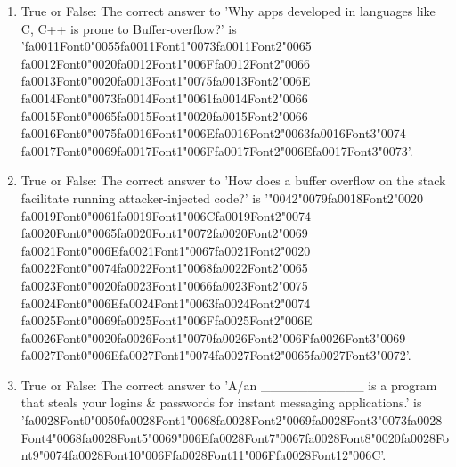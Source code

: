 \documentclass[12pt]{article}
\begin{document}
\begin{enumerate}[label=\arabic*.]
\item True or False: The correct answer to 'Why apps developed in languages like C, C++ is prone to Buffer-overflow?' is '{\csname fa0011Font0\endcsname\char"0055}{\csname fa0011Font1\endcsname\char"0073}{\csname fa0011Font2\endcsname\char"0065} {\csname fa0012Font0\endcsname\char"0020}{\csname fa0012Font1\endcsname\char"006F}{\csname fa0012Font2\endcsname\char"0066} {\csname fa0013Font0\endcsname\char"0020}{\csname fa0013Font1\endcsname\char"0075}{\csname fa0013Font2\endcsname\char"006E} {\csname fa0014Font0\endcsname\char"0073}{\csname fa0014Font1\endcsname\char"0061}{\csname fa0014Font2\endcsname\char"0066} {\csname fa0015Font0\endcsname\char"0065}{\csname fa0015Font1\endcsname\char"0020}{\csname fa0015Font2\endcsname\char"0066} {\csname fa0016Font0\endcsname\char"0075}{\csname fa0016Font1\endcsname\char"006E}{\csname fa0016Font2\endcsname\char"0063}{\csname fa0016Font3\endcsname\char"0074} {\csname fa0017Font0\endcsname\char"0069}{\csname fa0017Font1\endcsname\char"006F}{\csname fa0017Font2\endcsname\char"006E}{\csname fa0017Font3\endcsname\char"0073}'.
\item True or False: The correct answer to 'How does a buffer overflow on the stack facilitate running attacker-injected code?' is '{\char"0042}{\char"0079}{\csname fa0018Font2\endcsname\char"0020} {\csname fa0019Font0\endcsname\char"0061}{\csname fa0019Font1\endcsname\char"006C}{\csname fa0019Font2\endcsname\char"0074} {\csname fa0020Font0\endcsname\char"0065}{\csname fa0020Font1\endcsname\char"0072}{\csname fa0020Font2\endcsname\char"0069} {\csname fa0021Font0\endcsname\char"006E}{\csname fa0021Font1\endcsname\char"0067}{\csname fa0021Font2\endcsname\char"0020} {\csname fa0022Font0\endcsname\char"0074}{\csname fa0022Font1\endcsname\char"0068}{\csname fa0022Font2\endcsname\char"0065} {\csname fa0023Font0\endcsname\char"0020}{\csname fa0023Font1\endcsname\char"0066}{\csname fa0023Font2\endcsname\char"0075} {\csname fa0024Font0\endcsname\char"006E}{\csname fa0024Font1\endcsname\char"0063}{\csname fa0024Font2\endcsname\char"0074} {\csname fa0025Font0\endcsname\char"0069}{\csname fa0025Font1\endcsname\char"006F}{\csname fa0025Font2\endcsname\char"006E} {\csname fa0026Font0\endcsname\char"0020}{\csname fa0026Font1\endcsname\char"0070}{\csname fa0026Font2\endcsname\char"006F}{\csname fa0026Font3\endcsname\char"0069} {\csname fa0027Font0\endcsname\char"006E}{\csname fa0027Font1\endcsname\char"0074}{\csname fa0027Font2\endcsname\char"0065}{\csname fa0027Font3\endcsname\char"0072}'.
\item True or False: The correct answer to 'A/an \_\_\_\_\_\_\_\_\_\_\_ is a program that steals your logins \& passwords for instant messaging applications.' is '{\csname fa0028Font0\endcsname\char"0050}{\csname fa0028Font1\endcsname\char"0068}{\csname fa0028Font2\endcsname\char"0069}{\csname fa0028Font3\endcsname\char"0073}{\csname fa0028Font4\endcsname\char"0068}{\csname fa0028Font5\endcsname\char"0069}{\char"006E}{\csname fa0028Font7\endcsname\char"0067}{\csname fa0028Font8\endcsname\char"0020}{\csname fa0028Font9\endcsname\char"0074}{\csname fa0028Font10\endcsname\char"006F}{\csname fa0028Font11\endcsname\char"006F}{\csname fa0028Font12\endcsname\char"006C}'.

\end{enumerate}
\end{document}
